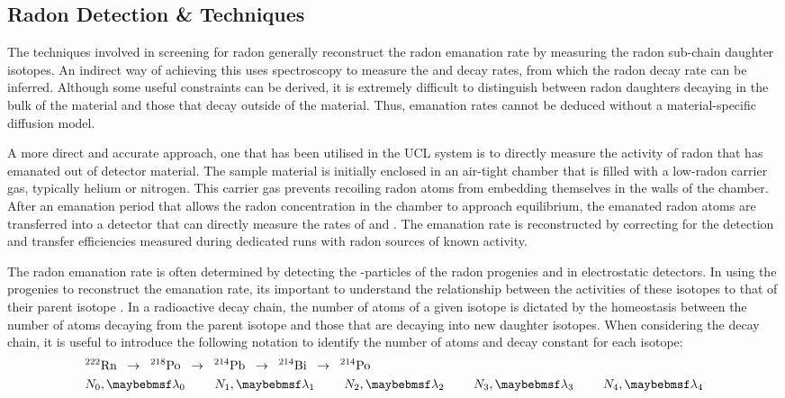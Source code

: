\subsection{Radon Detection \& Techniques}
\label{secsec:rn_detection_techniques}

The techniques involved in screening for radon generally reconstruct the radon emanation rate by measuring the radon sub-chain daughter isotopes. An indirect way of achieving this uses \gamma{} spectroscopy to measure the \BiTOF{} and \PbTOF{} decay rates, from which the radon decay rate can be inferred. Although some useful constraints can be derived, it is extremely difficult to distinguish between radon daughters decaying in the bulk of the material and those that decay outside of the material. Thus, emanation rates cannot be deduced without a material-specific diffusion model.

A more direct and accurate approach, one that has been utilised in the UCL system is to directly measure the activity of radon that has emanated out of detector material. The sample material is initially enclosed in an air-tight chamber that is filled with a low-radon carrier gas, typically helium or nitrogen. This carrier gas prevents recoiling radon atoms from embedding themselves in the walls of the chamber.  After an emanation period that allows the radon concentration in the chamber to approach equilibrium, the emanated radon atoms are transferred into a detector that can directly measure the rates of \PoTOE{} and \PoTOF{}. The emanation rate is reconstructed by correcting for the detection and transfer efficiencies measured during dedicated runs with radon sources of known activity. 

The radon emanation rate is often determined by detecting the \alpha-particles of the radon progenies \PoTOE{} and \PoTOF{} in electrostatic detectors. In using the progenies to reconstruct the emanation rate, its important to understand the relationship between the activities of these isotopes to that of their parent isotope \RnTTT{}. In a radioactive decay chain, the number of atoms of a given isotope is dictated by the homeostasis between the number of atoms decaying from the parent isotope and those that are decaying into new daughter isotopes. When considering the decay chain, it is useful to introduce the following notation to identify the number of atoms and decay constant for each isotope:
%
\begin{align*}
    &^{222}\MathText{Rn} \;\; \rightarrow \;\; ^{218}\MathText{Po} \;\; \rightarrow \;\; ^{214}\MathText{Pb} \;\; \rightarrow \;\; ^{214}\MathText{Bi} \;\; \rightarrow \;\; ^{214}\MathText{Po} \\
    &N_{0}, \lambda{}_{0} \,\,\,\,\,\,\,\,\,\,\,\,\,\,
    N_{1}, \lambda{}_{1} \,\,\,\,\,\,\,\,\,\,\,\,\,\,
    N_{2}, \lambda{}_{2} \,\,\,\,\,\,\,\,\,\,\,\,\,\,
    N_{3}, \lambda{}_{3} \,\,\,\,\,\,\,\,\,\,\,\,\,\,
    N_{4}, \lambda{}_{4} 
    \label{eq:radon_decay_chain}
\end{align*}
%

